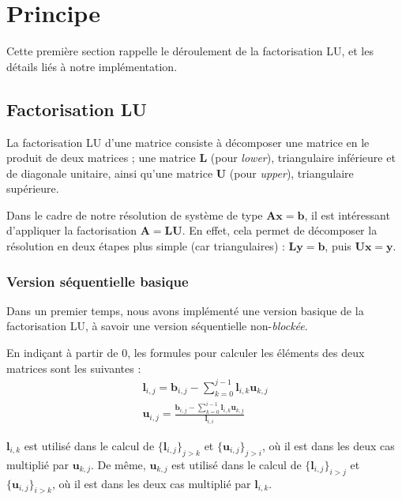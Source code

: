 \newpage
\section{Principe}

Cette première section rappelle le déroulement de la factorisation LU, et les détails liés à notre implémentation.

\subsection{Factorisation LU}

La factorisation LU d'une matrice consiste à décomposer une matrice en le produit de deux matrices ; une matrice $\mathbf{L}$ (pour \emph{lower}), triangulaire inférieure et de diagonale unitaire, ainsi qu'une matrice $\mathbf{U}$  (pour \emph{upper}), triangulaire supérieure.

Dans le cadre de notre résolution de système de type $\mathbf{Ax}=\mathbf{b}$, il est intéressant d'appliquer la factorisation $\mathbf{A}=\mathbf{LU}$. En effet, cela permet de décomposer la résolution en deux étapes plus simple (car triangulaires) : $\mathbf{Ly}=\mathbf{b}$, puis $\mathbf{Ux}=\mathbf{y}$.

\subsubsection{Version séquentielle basique}

Dans un premier temps, nous avons implémenté une version basique de la factorisation LU, à savoir une version séquentielle non-\emph{blockée}.

En indiçant à partir de 0, les formules pour calculer les éléments des deux matrices sont les suivantes :
\begin{eqnarray*}
\mathbf{l}_{i,j} = \mathbf{b}_{i,j} - \sum\limits_{k=0}^{j-1}\mathbf{l}_{i,k}\mathbf{u}_{k,j}\\
\mathbf{u}_{i,j} = \frac{\mathbf{b}_{i,j}-\sum\limits_{k=0}^{i-1}\mathbf{l}_{i,k}\mathbf{u}_{k,j}}{\mathbf{l}_{i,i}}
\end{eqnarray*}

$\mathbf{l}_{i,k}$ est utilisé dans le calcul de $\{\mathbf{l}_{i,j}\}_{j>k}$ et $\{\mathbf{u}_{i,j}\}_{j>i}$, où il est dans les deux cas multiplié par $\mathbf{u}_{k,j}$. De même, $\mathbf{u}_{k,j}$ est utilisé dans le calcul de $\{\mathbf{l}_{i,j}\}_{i>j}$ et $\{\mathbf{u}_{i,j}\}_{i>k}$, où il est dans les deux cas multiplié par $\mathbf{l}_{i,k}$.

